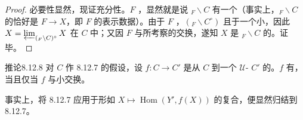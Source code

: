 \begin{proof}
必要性显然，现证充分性。$F$ ，显然就是说 ${}_F\backslash C$ 有一个（事实上，${}_F\backslash C$ 的恰好是 $F\to X$，即 $F$ 的表示数据）。由于 $F$ ，$({}_F\backslash C^\circ)$ 且于一个小，因此 $X=\varprojlim_{({}_F\backslash C)^\circ}X$ 在 $C$ 中；又因 $F$ 与所考察的交换，遂知 $X$ 是 ${}_F\backslash C$ 的。证毕。
\end{proof}
\begin{SGAresult}{推论}{8.12.8}
对 $C$ 作 8.12.7 的假设，设 $f:C\to C'$ 是从 $C$ 到一个 $\mathcal U$- $C'$ 的。$f$ 有，当且仅当 $f$ 与小交换。
\end{SGAresult}
事实上，将 8.12.7 应用于形如 $X\mapsto\operatorname{Hom}(Y',f(X))$ 的复合，便显然归结到 8.12.7。

